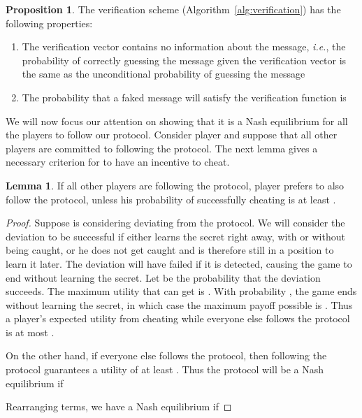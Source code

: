 \documentclass[12pt]{article}
\theoremstyle{definition}
\newtheorem{lemma}[theorem]{Lemma}
\newtheorem{proposition}[theorem]{Proposition}
\newcommand{\ie}{\emph{i.e.}}
\begin{document}
\begin{proposition}\label{prop:hash}
The verification scheme (Algorithm~\ref{alg:verification}) has the following 
properties:
\begin{enumerate}
\item The verification vector contains no information about the message, \ie, 
the probability of correctly guessing the message given the verification 
vector is the same as the unconditional probability of guessing the message
\item The probability that a faked message will satisfy the verification 
function is 
\end{enumerate}
\end{proposition}









We will now focus our attention on showing that it is a Nash 
equilibrium for all the players to follow our protocol.   
Consider player  and suppose that all other players are committed 
to following the protocol. The next lemma gives a necessary criterion 
for  to have an incentive to cheat.

\begin{lemma}\label{lem:threshold}
If all other players are following the protocol, player  prefers 
to also follow the protocol, unless his probability of successfully 
cheating is at least .
\end{lemma}
\begin{proof}
Suppose  is considering deviating from the protocol. We will consider the 
deviation to be successful if either  learns the secret right away, with 
or without being caught, or he does not get caught
and is therefore still in a position to learn it later. The deviation will 
have failed if it is detected, causing the game to end without  learning 
the secret.
Let  be the probability that the deviation succeeds.
The maximum utility that  can get is . With probability , 
the game ends without  learning the secret,
in which case the maximum payoff possible is . Thus a player's 
expected utility from cheating while everyone else follows the 
protocol is at most .

On the other hand, if everyone else follows the protocol, then following 
the protocol guarantees a utility of at least . 
Thus the protocol will be a Nash equilibrium if 

Rearranging terms, we have a Nash equilibrium if 

\end{proof}
\end{document}
